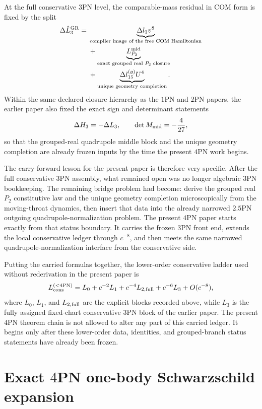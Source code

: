 \documentclass[11pt]{article}
\begin{document}
At the full conservative $3$PN level, the comparable-mass residual in COM form
 is fixed by the split
\[
\begin{aligned}
\Delta \hat L_3^{\rm GR}
={}&
\underbrace{\Delta l_1v^8}_{\text{compiler image of the free COM Hamiltonian}}
\\
&+
\underbrace{L_{P_2}^{\rm mid}}_{\text{exact grouped real }P_2\text{ closure}}
\\
&+
\underbrace{\Delta l_{15}^{(g)}U^4}_{\text{unique geometry completion}}.
\end{aligned}
\]
Within the same declared closure hierarchy as the $1$PN and $2$PN papers, the
 earlier paper also fixed the exact sign and determinant statements
\[
\Delta H_3=-\Delta L_3,
\qquad
\det M_{\rm mid}=-\frac4{27},
\]
so that the grouped-real quadrupole middle block and the unique geometry
 completion are already frozen inputs by the time the present $4$PN work begins.

The carry-forward lesson for the present paper is therefore very specific.
After the full conservative $3$PN assembly, what remained open was no longer
 algebraic $3$PN bookkeeping.  The remaining bridge problem had become: derive
 the grouped real $P_2$ constitutive law and the unique geometry completion
 microscopically from the moving-throat dynamics, then insert that data into the
 already narrowed $2.5$PN outgoing quadrupole-normalization problem.  The
 present $4$PN paper starts exactly from that status boundary.  It carries the
 frozen $3$PN front end, extends the local conservative ledger through $c^{-8}$,
 and then meets the same narrowed quadrupole-normalization interface from the
 conservative side.

Putting the carried formulas together, the lower-order conservative ladder used
 without rederivation in the present paper is
\[
L_{\rm cons}^{(<4\mathrm{PN})}
=
L_0+c^{-2}L_1+c^{-4}L_{2,\rm full}+c^{-6}L_3+O(c^{-8}),
\]
where $L_0$, $L_1$, and $L_{2,\rm full}$ are the explicit blocks recorded
 above, while $L_3$ is the fully assigned fixed-chart conservative $3$PN block
 of the earlier paper.  The present $4$PN theorem chain is not allowed to alter
 any part of this carried ledger.  It begins only after these lower-order data,
 identities, and grouped-branch status statements have already been frozen.


\section{Exact \texorpdfstring{$4$}{4}PN one-body Schwarzschild expansion}
\label{app:onebody-expansion}
\end{document}
